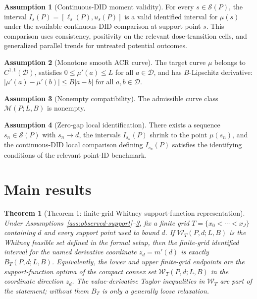 \documentclass[11pt]{article}
\theoremstyle{definition}
\newtheorem{assumption}{Assumption}
\theoremstyle{plain}
\newtheorem{theorem}{Theorem}
\theoremstyle{remark}
\begin{document}
\begin{assumption}[Continuous-DID moment validity]\label{ass:did-moments}
For every \(s\in\mathcal S(P)\), the interval \(I_s(P)=[\ell_s(P),u_s(P)]\) is a valid identified interval for \(\mu(s)\) under the available continuous-DID comparison at support point \(s\).  This comparison uses consistency, positivity on the relevant dose-transition cells, and generalized parallel trends for untreated potential outcomes.
\end{assumption}

\begin{assumption}[Monotone smooth ACR curve]\label{ass:smooth-monotone}
The target curve \(\mu\) belongs to \(C^{1,1}(\mathcal D)\), satisfies \(0\le\mu'(a)\le L\) for all \(a\in\mathcal D\), and has \(B\)-Lipschitz derivative: \(|\mu'(a)-\mu'(b)|\le B|a-b|\) for all \(a,b\in\mathcal D\).
\end{assumption}

\begin{assumption}[Nonempty compatibility]\label{ass:nonempty}
The admissible curve class \(\mathcal M(P;L,B)\) is nonempty.
\end{assumption}

\begin{assumption}[Zero-gap local identification]\label{ass:zero-gap}
There exists a sequence \(s_n\in\mathcal S(P)\) with \(s_n\to d\), the intervals \(I_{s_n}(P)\) shrink to the point \(\mu(s_n)\), and the continuous-DID local comparison defining \(I_{s_n}(P)\) satisfies the identifying conditions of the relevant point-ID benchmark.
\end{assumption}

\section{Main results}
\begin{theorem}[Theorem 1: finite-grid Whitney support-function representation]\label{thm:finite-grid-support}
Under Assumptions~\ref{ass:observed-support}--\ref{ass:nonempty}, fix a finite grid \(T=\{x_0<\cdots<x_J\}\) containing \(d\) and every support point used to bound \(d\).  If \(\mathcal W_T(P,d;L,B)\) is the Whitney feasible set defined in the formal setup, then the finite-grid identified interval for the named derivative coordinate \(z_d=m'(d)\) is exactly \(B_T(P,d;L,B)\).  Equivalently, the lower and upper finite-grid endpoints are the support-function optima of the compact convex set \(\mathcal W_T(P,d;L,B)\) in the coordinate direction \(z_d\).  The value-derivative Taylor inequalities in \(\mathcal W_T\) are part of the statement; without them \(B_T\) is only a generally loose relaxation.
\end{theorem}
\end{document}

